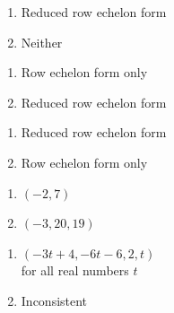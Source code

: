 \documentclass{ximera}
\begin{document}
	\author{Stitz-Zeager}




\begin{multicols}{2}
\begin{enumerate}

\item Reduced row echelon form
\item Neither

\setcounter{HW}{\value{enumi}}
\end{enumerate}
\end{multicols}


\begin{multicols}{2}
\begin{enumerate}
\setcounter{enumi}{\value{HW}}



\item Row echelon form only
\item Reduced row echelon form

\setcounter{HW}{\value{enumi}}
\end{enumerate}
\end{multicols}


\begin{multicols}{2}
\begin{enumerate}
\setcounter{enumi}{\value{HW}}

\item Reduced row echelon form
\item Row echelon form only

\setcounter{HW}{\value{enumi}}
\end{enumerate}
\end{multicols}

\begin{multicols}{2}
\begin{enumerate}
\setcounter{enumi}{\value{HW}}

\item $(-2, 7)$
\item $(-3, 20, 19)$

\setcounter{HW}{\value{enumi}}
\end{enumerate}
\end{multicols}


\begin{multicols}{2}
\begin{enumerate}
\setcounter{enumi}{\value{HW}}

\item $(-3t + 4, -6t - 6, 2, t)$ \\
for all real numbers $t$
\item Inconsistent


\setcounter{HW}{\value{enumi}}
\end{enumerate}
\end{multicols}
\end{document}
